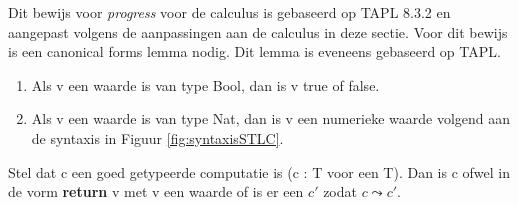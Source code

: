 Dit bewijs voor \emph{progress} voor de calculus is gebaseerd op TAPL 8.3.2 \cite{Pierce2002} en aangepast volgens de aanpassingen aan de calculus in deze sectie. Voor dit bewijs is een canonical forms lemma nodig. Dit lemma is eveneens gebaseerd op TAPL.\newline
\begin{lemma}
    \label{lem:CanFormArith}
     \begin{enumerate}
         \item Als v een waarde is van type Bool, dan is v true of false.
         \item Als v een waarde is van type Nat, dan is v een numerieke waarde volgend aan de syntaxis in Figuur \ref{fig:syntaxisSTLC}.
     \end{enumerate}
\end{lemma}
\begin{theorem}[Progress]
Stel dat c een goed getypeerde computatie is (c : T voor een T). Dan is c ofwel in de vorm \textbf{return} v met v een waarde of is er een $c'$ zodat $c \leadsto c'$.
\end{theorem}
